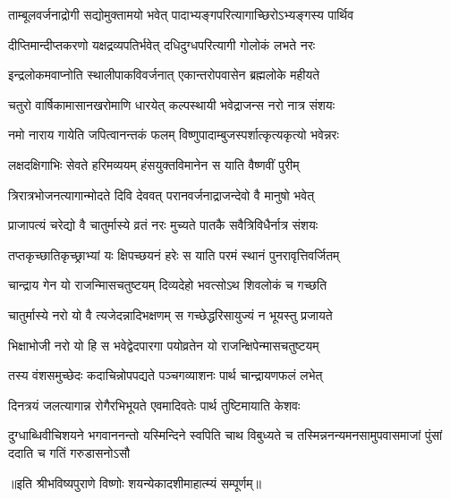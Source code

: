 \twolineshloka
{ताम्बूलवर्जनाद्रोगी सद्योमुक्तामयो भवेत्}
{पादाभ्यङ्गपरित्यागाच्छिरोऽभ्यङ्गस्य पार्थिव} %

\twolineshloka
{दीप्तिमान्दीप्तकरणो यक्षद्रव्यपतिर्भवेत्}
{दधिदुग्धपरित्यागी गोलोकं लभते नरः} %

\twolineshloka
{इन्द्रलोकमवाप्नोति स्थालीपाकविवर्जनात्}
{एकान्तरोपवासेन ब्रह्मलोके महीयते} %

\twolineshloka
{चतुरो वार्षिकामासानखरोमाणि धारयेत्}
{कल्पस्थायी भवेद्राजन्स नरो नात्र संशयः} %

\twolineshloka
{नमो नाराय गायेति जपित्वानन्तकं फलम्}
{विष्णुपादाम्बुजस्पर्शात्कृत्यकृत्यो भवेन्नरः} %

\twolineshloka
{लक्षदक्षिगाभिः सेवते हरिमव्ययम्}
{हंसयुक्तविमानेन स याति वैष्णवीं पुरीम्} %

\twolineshloka
{त्रिरात्रभोजनत्यागान्मोदते दिवि देववत्}
{परानवर्जनाद्राजन्देवो वै मानुषो भवेत्} %

\twolineshloka
{प्राजापत्यं चरेद्यो वै चातुर्मास्ये व्रतं नरः}
{मुच्यते पातकै सवैत्रिविधैर्नात्र संशयः} %

\twolineshloka
{तप्तकृच्छातिकृच्छ्राभ्यां यः क्षिपच्छयनं हरेः}
{स याति परमं स्थानं पुनरावृत्तिवर्जितम्} %

\twolineshloka
{चान्द्राय गेन यो राजन्मिासचतुष्टयम्}
{दिव्यदेहो भवत्सोऽथ शिवलोकं च गच्छति} %

\twolineshloka
{चातुर्मास्ये नरो यो वै त्यजेदन्नादिभक्षणम्}
{स गच्छेद्धरिसायुज्यं न भूयस्तु प्रजायते} %

\twolineshloka
{भिक्षाभोजी नरो यो हि स भवेद्वेदपारगा}
{पयोव्रतेन यो राजन्क्षिपेन्मासचतुष्टयम्} %

\twolineshloka
{तस्य वंशसमुच्छेदः कदाचिन्नोपपद्यते}
{पञ्चगव्याशनः पार्थ चान्द्रायणफलं लभेत्} %

\twolineshloka
{दिनत्रयं जलत्यागान्न रोगैरभिभूयते}
{एवमादिवतेः पार्थ तुष्टिमायाति केशवः} %

\fourlineindentedshloka
{दुग्धाब्धिवीचिशयने भगवाननन्तो}
{यस्मिन्दिने स्वपिति चाथ विबुध्यते च}
{तस्मिन्ननन्यमनसामुपवासमाजां}
{पुंसां ददाति च गतिं गरुडासनोऽसौ} %

॥इति श्रीभविष्यपुराणे विष्णोः शयन्येकादशीमाहात्म्यं सम्पूर्णम्॥


\hyperref[sec:ekadashi_mahatmyam_vrata_raja]{\closesub}
\clearpage

\label{sec:vrata-raja-shravana-krishna-kamika}


